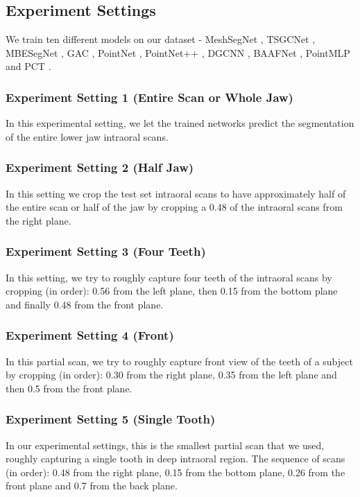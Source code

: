 \documentclass[letterpaper, 10 pt, conference]{ieeeconf}  %
\begin{document}
\subsection{Experiment Settings}
We train ten different models on our dataset - MeshSegNet \cite{lian2020deep}, TSGCNet \cite{zhang2021tsgcnet}, MBESegNet \cite{li2022multi}, GAC \cite{zhao20213d}, PointNet \cite{qi2017pointnet}, PointNet++ \cite{qi2017pointnet++}, DGCNN \cite{wang2019dynamic}, BAAFNet  \cite{qiu2021semantic}, PointMLP \cite{ma2022rethinking} and  PCT \cite{guo2021pct}.
\subsubsection{Experiment Setting 1 (Entire Scan or Whole Jaw)} In this experimental setting, we let the trained networks predict the segmentation of the entire lower jaw intraoral scans. 
\subsubsection{Experiment Setting 2 (Half Jaw)} In this setting we crop the test set intraoral scans to have approximately half of the entire scan or half of the jaw  
by cropping a 0.48 of the intraoral scans from the right plane. 

\subsubsection{Experiment Setting 3 (Four Teeth)} In this setting, we try to roughly capture four teeth of the intraoral scans by cropping (in order): 0.56 from the left plane, then 0.15 from the bottom plane and finally 0.48 from the front plane.
\subsubsection{Experiment Setting 4 (Front)}
In this partial scan, we try to roughly capture front view of the teeth of a subject by cropping (in order): 0.30 from the right plane, 0.35 from the left plane and then 0.5 from the front plane.
\subsubsection{Experiment Setting 5 (Single Tooth)} In our experimental settings, this is the smallest partial scan that we used, roughly capturing a single tooth in deep intraoral region. The sequence of scans (in order): 0.48 from the right plane, 0.15 from the bottom plane, 0.26 from the front plane and 0.7 from the back plane. %
\end{document}

